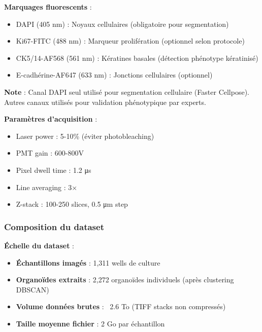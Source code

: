 \textbf{Marquages fluorescents} :
\begin{itemize}
    \item DAPI (405 nm) : Noyaux cellulaires (obligatoire pour segmentation)
    \item Ki67-FITC (488 nm) : Marqueur prolifération (optionnel selon protocole)
    \item CK5/14-AF568 (561 nm) : Kératines basales (détection phénotype kératinisé)
    \item E-cadhérine-AF647 (633 nm) : Jonctions cellulaires (optionnel)
\end{itemize}

\textbf{Note} : Canal DAPI seul utilisé pour segmentation cellulaire (Faster Cellpose). Autres canaux utilisés pour validation phénotypique par experts.

\textbf{Paramètres d'acquisition} :
\begin{itemize}
    \item Laser power : 5-10\% (éviter photobleaching)
    \item PMT gain : 600-800V
    \item Pixel dwell time : 1.2 μs
    \item Line averaging : 3×
    \item Z-stack : 100-250 slices, 0.5 μm step
\end{itemize}

\subsubsection{Composition du dataset}

\textbf{Échelle du dataset} :
\begin{itemize}
    \item \textbf{Échantillons imagés} : 1,311 wells de culture
    \item \textbf{Organoïdes extraits} : 2,272 organoïdes individuels (après clustering DBSCAN)
    \item \textbf{Volume données brutes} : ~2.6 To (TIFF stacks non compressés)
    \item \textbf{Taille moyenne fichier} : 2 Go par échantillon
\end{itemize}

